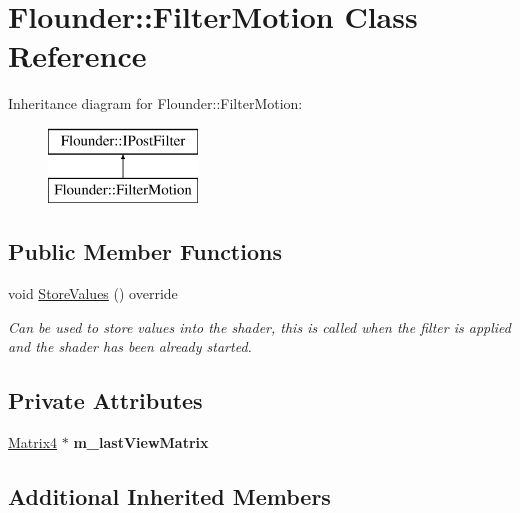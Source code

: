 \hypertarget{class_flounder_1_1_filter_motion}{}\section{Flounder\+:\+:Filter\+Motion Class Reference}
\label{class_flounder_1_1_filter_motion}
Inheritance diagram for Flounder\+:\+:Filter\+Motion\+:\begin{figure}[H]
\begin{center}
\leavevmode
\includegraphics[height=2.000000cm]{class_flounder_1_1_filter_motion}
\end{center}
\end{figure}
\subsection*{Public Member Functions}
\begin{DoxyCompactItemize}
\item 
void \hyperlink{class_flounder_1_1_filter_motion_ab3260386a2a7ffc8a3aaa61ab910df82}{Store\+Values} () override
\begin{DoxyCompactList}\small\item\em Can be used to store values into the shader, this is called when the filter is applied and the shader has been already started. \end{DoxyCompactList}\end{DoxyCompactItemize}
\subsection*{Private Attributes}
\begin{DoxyCompactItemize}
\item 
\mbox{\label{class_flounder_1_1_filter_motion_a61a21f6d8bf371c1ca6509a16241100b}} 
\hyperlink{class_flounder_1_1_matrix4}{Matrix4} $\ast$ {\bfseries m\+\_\+last\+View\+Matrix}
\end{DoxyCompactItemize}
\subsection*{Additional Inherited Members}


